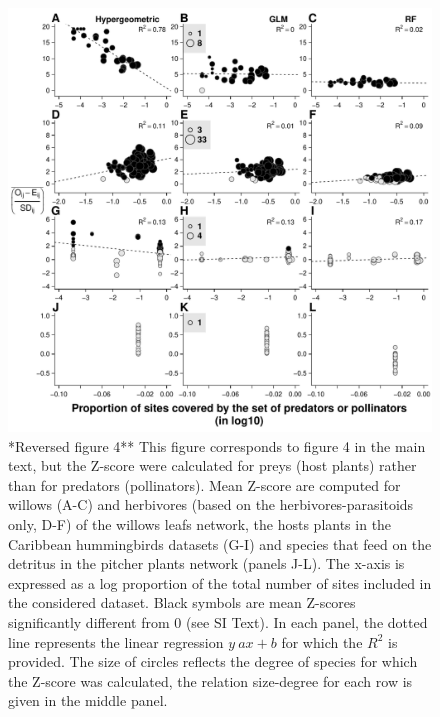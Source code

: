 \begin{figure}
\centering
\includegraphics{chapitre3/figS8.pdf}
\caption{*Reversed figure 4** This figure corresponds to figure 4 in the
main text, but the Z-score were calculated for preys (host plants)
rather than for predators (pollinators). Mean Z-score are computed for
willows (A-C) and herbivores (based on the herbivores-parasitoids only,
D-F) of the willows leafs network, the hosts plants in the Caribbean
hummingbirds datasets (G-I) and species that feed on the detritus in the
pitcher plants network (panels J-L). The x-axis is expressed as a log
proportion of the total number of sites included in the considered
dataset. Black symbols are mean Z-scores significantly different from 0
(see SI Text). In each panel, the dotted line represents the linear
regression \(y~ax+b\) for which the \(R^2\) is provided. The size of
circles reflects the degree of species for which the Z-score was
calculated, the relation size-degree for each row is given in the middle
panel.\label{fig:degocc2}}
\end{figure}

\newpage

